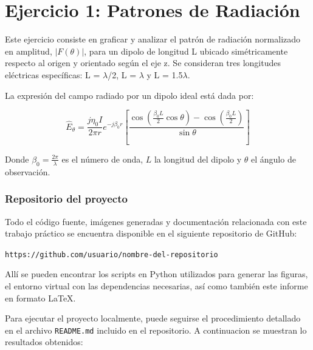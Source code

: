 \section{Ejercicio 1: Patrones de Radiación}
Este ejercicio consiste en graficar y analizar el patrón de radiación normalizado en amplitud, $|F(\theta)|$, para un dipolo de longitud L ubicado simétricamente respecto al origen y orientado según el eje z. Se consideran tres longitudes eléctricas específicas: L = $\lambda$/2, L = $\lambda$ y L = 1.5$\lambda$.


La expresión del campo radiado por un dipolo ideal está dada por:

\[
\hat{E}_\theta = \frac{j \eta_0 I}{2\pi r} e^{-j\beta_0 r} \left[ \frac{\cos\left(\frac{\beta_0 L}{2} \cos\theta\right) - \cos\left(\frac{\beta_0 L}{2}\right)}{\sin\theta} \right]
\]

Donde $\beta_0 = \frac{2\pi}{\lambda}$ es el número de onda, $L$ la longitud del dipolo y $\theta$ el ángulo de observación.

\subsubsection*{Repositorio del proyecto}

Todo el código fuente, imágenes generadas y documentación relacionada con este trabajo práctico se encuentra disponible en el siguiente repositorio de GitHub:

\begin{center}
\texttt{https://github.com/usuario/nombre-del-repositorio}
\end{center}

Allí se pueden encontrar los scripts en Python utilizados para generar las figuras, el entorno virtual con las dependencias necesarias, así como también este informe en formato \LaTeX{}.

Para ejecutar el proyecto localmente, puede seguirse el procedimiento detallado en el archivo \texttt{README.md} incluido en el repositorio.
A continuacion se muestran lo resultados obtenidos:

\def\relativelengths{{0.12},{0.25},{0.50},{0.75},{1.25},{1.50},{1.75},{2.00},{2.25}}

\newcommand{\incluirImagenes}[1]{
  \begin{figure}
    \centering
    \begin{subfigure}[b]{0.45\textwidth}
        \texttt{[image: Imagenes2D/2D\_Lrel\_\#1.png]}
        \caption{Gráfico 2D}
    \end{subfigure}
    \begin{subfigure}[b]{0.45\textwidth}
        \texttt{[image: Imagenes3D/3D\_Lrel\_\#1.png]}
        \caption{Gráfico 3D}
    \end{subfigure}
    \caption{Patrón de radiación para $L/\lambda = #1$}
  \end{figure}
}

